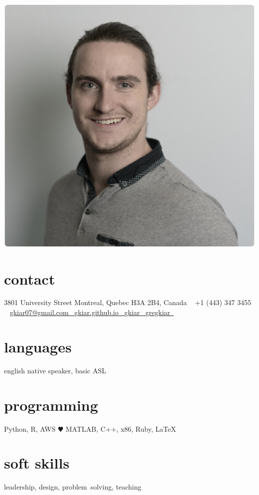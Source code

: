 \documentclass[]{friggeri-cv} %
\begin{document}


\begin{aside} %
\includegraphics[width=\textwidth]{./headshot.pdf}
\section{contact}
3801 University Street
Montreal, Quebec
H3A 2B4, Canada
~
+1 (443) 347 3455~{\color{green} \faMobilePhone}
~
\href{mailto:gkiar07@gmail.com}{gkiar07@gmail.com~{\color{red} \faEnvelope}}
\href{http://gkiar.github.io}{gkiar.github.io~{\color{brown} \faGlobe}}
\href{http://github.com/gkiar}{gkiar~{\color{purple} \faGithub}}
\href{https://www.linkedin.com/in/gregkiar}{gregkiar~{\color{blue} \faLinkedin}}
\section{languages}
english native speaker,
basic ASL
\section{programming}
Python, R, AWS {\color{red} $\varheartsuit$}
MATLAB, C++, x86,
Ruby, LaTeX
\section{soft skills}
leadership, design, problem~solving, teaching
\end{aside}
\end{document}
